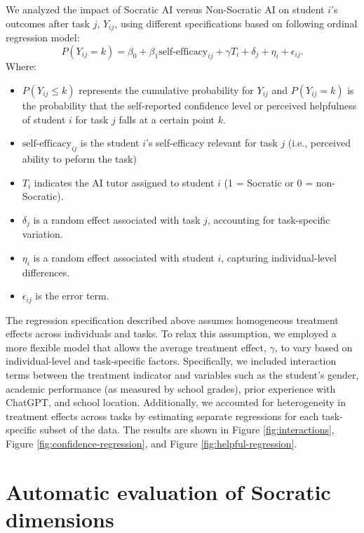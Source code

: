 \documentclass[
  11pt,
]{article}
\begin{document}
We analyzed the impact of Socratic AI versus Non-Socratic AI on student \(i\)'s outcomes after task \(j\), \(Y_{ij}\), using different specifications based on following ordinal regression model:
\[
  P(Y_{ij} = k) = 
    \beta_0 + \beta_1 \text{self-efficacy}_{ij} + \gamma T_{i} 
    + \delta_j + \eta_i + \epsilon_{ij}.
\]
Where:

\begin{itemize}
\item
  \(P(Y_{ij} \leq k)\) represents the cumulative probability for \(Y_{ij}\) and \(P(Y_{ij} = k)\) is the probability that the self-reported confidence level or perceived helpfulness of student \(i\) for task \(j\) falls at a certain point \(k\).
\item
  \(\text{self-efficacy}_{ij}\) is the student \(i\)'s self-efficacy relevant for task \(j\) (i.e., perceived ability to peform the task)
\item
  \(T_i\) indicates the AI tutor assigned to student \(i\) (1 = Socratic or 0 = non-Socratic).
\item
  \(\delta_j\) is a random effect associated with task \(j\), accounting for task-specific variation.
\item
  \(\eta_i\) is a random effect associated with student \(i\), capturing individual-level differences.
\item
  \(\epsilon_{ij}\) is the error term.
\end{itemize}

The regression specification described above assumes homogeneous treatment effects across individuals and tasks. To relax this assumption, we employed a more flexible model that allows the average treatment effect, \(\gamma\), to vary based on individual-level and task-specific factors. Specifically, we included interaction terms between the treatment indicator and variables such as the student's gender, academic performance (as measured by school grades), prior experience with ChatGPT, and school location. Additionally, we accounted for heterogeneity in treatment effects across tasks by estimating separate regressions for each task-specific subset of the data. The results are shown in Figure \ref{fig:interactions}, Figure \ref{fig:confidence-regression}, and Figure \ref{fig:helpful-regression}.

\section{Automatic evaluation of Socratic dimensions}\label{sec:socratic-dimension}
\end{document}
